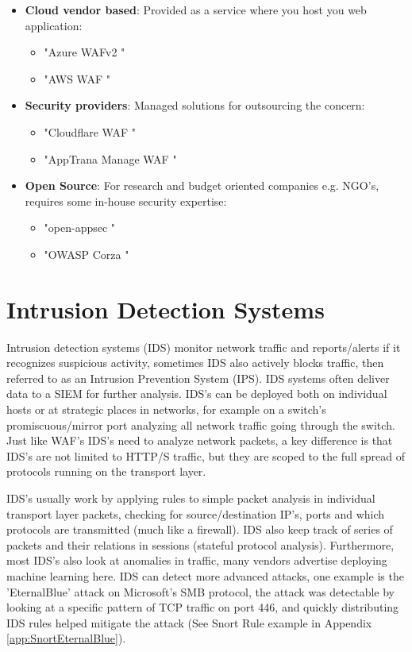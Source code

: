 \documentclass[
	letterpaper, %
	10pt, %
	unnumberedsections, %
	twoside, %
]{APAAssignment}
\begin{document}
\begin{itemize}
	
	\item{\textbf{Cloud vendor based}: Provided as a service where you host you web application: 
	\begin{itemize}
		\item "Azure WAFv2 \cite{AzureWAF}"
		\item "AWS WAF \cite{AWSWAF}"
	\end{itemize}
	}
	
	\item{\textbf{Security providers}: Managed solutions for outsourcing the concern:
	\begin{itemize}
		\item "Cloudflare WAF \cite{CloudflareWAF}"
		\item "AppTrana Manage WAF \cite{AppTrana-WAF}"
	\end{itemize}
	}
	
	\item{
		\textbf{Open Source}: For research and budget oriented companies e.g. NGO's, requires some in-house security expertise: 
		\begin{itemize}
			\item "open-appsec \cite{open-appsec}"
			\item "OWASP Corza \cite{OWASPcorsa}"
		\end{itemize}
	} 
\end{itemize}


\section{Intrusion Detection Systems}
Intrusion detection systems (IDS) monitor network traffic and reports/alerts if it recognizes suspicious activity, sometimes IDS also actively blocks traffic, then referred to as an Intrusion Prevention System (IPS). IDS systems often deliver data to a SIEM for further analysis. IDS's can be deployed both on individual hosts or at strategic places in networks, for example on a switch's promiscuous/mirror port analyzing all network traffic going through the switch. Just like WAF's IDS's need to analyze network packets, a key difference is that IDS's are not limited to HTTP/S traffic, but they are scoped to the full spread of protocols running on the transport layer.

IDS's usually work by applying rules to simple packet analysis in individual transport layer packets, checking for source/destination IP's, ports and which protocols are transmitted (much like a firewall). IDS also keep track of series of packets and their relations in sessions (stateful protocol analysis). Furthermore, most IDS's also look at anomalies in traffic, many vendors advertise deploying machine learning here. IDS can detect more advanced attacks, one example is the 'EternalBlue' attack on Microsoft's SMB protocol, the attack was detectable by looking at a specific pattern of TCP traffic on port 446, and quickly distributing IDS rules helped mitigate the attack (See Snort Rule example in Appendix \ref{app:SnortEternalBlue}). 
\end{document}
